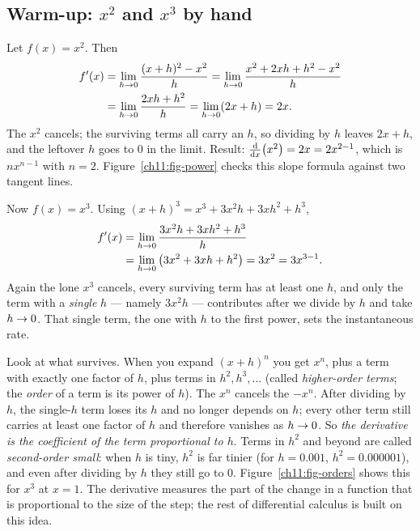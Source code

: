\subsection{Warm-up: $x^2$ and $x^3$ by hand}

\begin{example}\label{ch11:ex-x2}
Let $f(x)=x^2$. Then
\begin{align*}
  f'(x) &= \lim_{h\to 0}\frac{(x+h)^2 - x^2}{h}
         = \lim_{h\to 0}\frac{x^2 + 2xh + h^2 - x^2}{h} \\
        &= \lim_{h\to 0}\frac{2xh + h^2}{h}
         = \lim_{h\to 0}(2x + h)
         = 2x.
\end{align*}
The $x^2$ cancels; the surviving terms all carry an $h$, so dividing by $h$ leaves
$2x+h$, and the leftover $h$ goes to $0$ in the limit. Result: $\frac{\mathrm{d}}{\mathrm{d} x}\!\left(x^2\right)=2x = 2x^{2-1}$,
which is $n x^{n-1}$ with $n=2$. Figure~\ref{ch11:fig-power} checks this slope formula
against two tangent lines.
\end{example}

\begin{example}\label{ch11:ex-x3}
Now $f(x)=x^3$. Using $(x+h)^3 = x^3 + 3x^2 h + 3x h^2 + h^3$,
\begin{align*}
  f'(x) &= \lim_{h\to 0}\frac{3x^2 h + 3x h^2 + h^3}{h} \\
        &= \lim_{h\to 0}\big(3x^2 + 3x h + h^2\big)
         = 3x^2 = 3x^{3-1}.
\end{align*}
Again the lone $x^3$ cancels, every surviving term has at least one $h$, and only the term with
a \emph{single} $h$ --- namely $3x^2 h$ --- contributes after we divide by $h$ and take
$h\to 0$. That single term, the one with $h$ to the first power, sets the instantaneous
rate.
\end{example}

\begin{happeningbox}
Look at what survives. When you expand $(x+h)^n$ you get $x^n$, plus a term with exactly
one factor of $h$, plus terms in $h^2, h^3,\dots$ (called \emph{higher-order terms}; the
\emph{order} of a term is its power of $h$). The $x^n$ cancels the $-x^n$. After dividing
by $h$, the single-$h$ term loses its $h$ and no longer depends on $h$; every other term
still carries at least one factor of $h$ and therefore vanishes as $h\to 0$. So
\emph{the derivative is the coefficient of the term proportional to $h$}. Terms in $h^2$
and beyond are called \emph{second-order small}: when $h$ is tiny, $h^2$ is far tinier
(for $h=0.001$, $h^2=0.000001$), and even after dividing by $h$ they still go to $0$.
Figure~\ref{ch11:fig-orders} shows this for $x^3$ at $x=1$. The derivative measures the
part of the change in a function that is proportional to the size of the step; the rest
of differential calculus is built on this idea.
\end{happeningbox}

